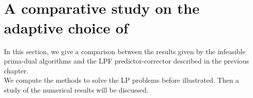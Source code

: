 \documentclass[a4paper,10 pt,titlepage,twoside]{book}
\theoremstyle{plain}
\theoremstyle{definition}
\theoremstyle{remark}
\begin{document}
\begin{figure}
	 \qquad%
	\\	 \qquad%
	\\
\end{figure}
\newpage
\section{A comparative study on the adaptive choice of \sigma}
In this section, we give a comparison between the results given by the infeasible prima-dual algorithms and the LPF predictor-corrector described in the previous chapter.\\ We compute the methods to solve the LP problems before illustrated. Then a study of the numerical results will be discussed.
\end{document}
